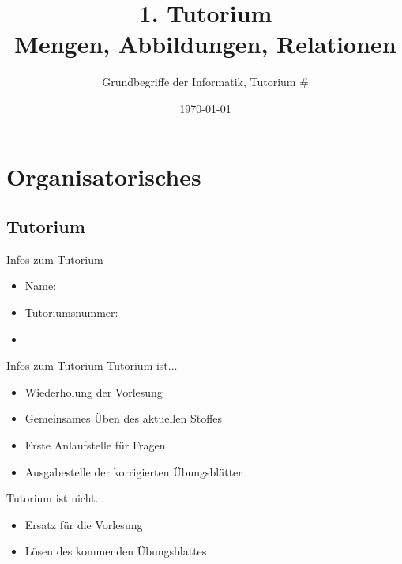 



\title[Mengen, Abbildungen, Relationen]{1. Tutorium\\ Mengen, Abbildungen, Relationen}
\subtitle{Grundbegriffe der Informatik, Tutorium \#\mytutnumber}
\date{\today}


\titleframe
\roadmap

\section{Organisatorisches}
\subsection{Tutorium}

	\aboutMeFrame

	\ifdefined \Moritz 
	\fi

	\begin{frame}{Infos zum Tutorium}
		\begin{itemize}
			\item Name: \myname
			\item Tutoriumsnummer: \mytutnumber
			\item \mytutinfos
		\end{itemize}	
	\end{frame}

	\begin{frame}{Infos zum Tutorium}
		Tutorium ist...\\
		\begin{itemize}
			\item Wiederholung der Vorlesung
			\item Gemeinsames Üben des aktuellen Stoffes
			\item Erste Anlaufstelle für Fragen
			\item Ausgabestelle der korrigierten Übungsblätter
		\end{itemize}
		\pause
		Tutorium ist nicht...\\
		\begin{itemize}
			\item Ersatz für die Vorlesung
			\item Lösen des kommenden Übungsblattes
		\end{itemize}
	\end{frame}
	
	

